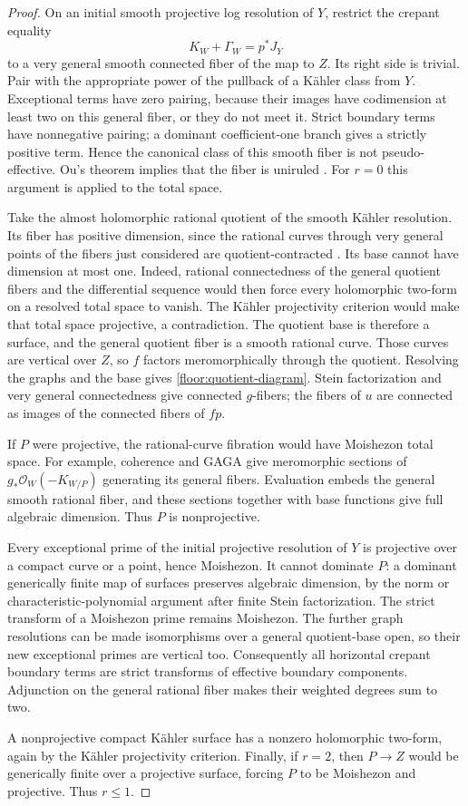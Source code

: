 \documentclass[11pt,letterpaper]{article}
\newcommand{\OO}{\mathcal{O}}
\theoremstyle{definition}
\theoremstyle{remark}
\begin{document}
\begin{proof}
On an initial smooth projective log resolution of $Y$, restrict the
crepant equality
\[
 K_W+\Gamma_W=p^*J_Y
\]
to a very general smooth connected fiber of the map to $Z$.
Its right side is trivial.  Pair with the appropriate power of the
pullback of a K\"ahler class from $Y$.  Exceptional terms have zero
pairing, because their images have codimension at least two on this
general fiber, or they do not meet it.  Strict boundary terms have
nonnegative pairing; a dominant coefficient-one branch gives a
strictly positive term.  Hence the canonical class of this smooth
fiber is not pseudo-effective.  Ou's theorem implies that the
fiber is uniruled \cite{OuUniruledness}.  For $r=0$ this argument is
applied to the total space.

Take the almost holomorphic rational quotient of the smooth
K\"ahler resolution.  Its fiber has positive dimension, since the
rational curves through very general points of the fibers just
considered are quotient-contracted
\cite{CampanaRationalQuotient}.  Its base cannot have dimension
at most one.  Indeed, rational connectedness of the general quotient
fibers and the differential sequence would then force every
holomorphic two-form on a resolved total space to vanish.  The
K\"ahler projectivity criterion would make that total space
projective, a contradiction.  The quotient base is therefore a
surface, and the general quotient fiber is a smooth rational curve.
Those curves are vertical over $Z$, so $f$ factors meromorphically
through the quotient.  Resolving the graphs and the base gives
\eqref{floor:quotient-diagram}.  Stein factorization and very
general connectedness give connected $g$-fibers; the fibers of $u$
are connected as images of the connected fibers of $fp$.

If $P$ were projective, the rational-curve fibration would have
Moishezon total space.  For example, coherence and GAGA give
meromorphic sections of $g_*\OO_W(-K_{W/P})$ generating its general
fibers.  Evaluation embeds the general smooth rational fiber, and
these sections together with base functions give full algebraic
dimension.  Thus $P$ is nonprojective.

Every exceptional prime of the initial projective resolution of
$Y$ is projective over a compact curve or a point, hence Moishezon.
It cannot dominate $P$: a dominant generically finite map of
surfaces preserves algebraic dimension, by the norm or
characteristic-polynomial argument after finite Stein
factorization.  The strict transform of a Moishezon prime remains
Moishezon.  The further graph resolutions can be made isomorphisms
over a general quotient-base open, so their new exceptional primes
are vertical too.  Consequently all horizontal crepant boundary
terms are strict transforms of effective boundary components.
Adjunction on the general rational fiber makes their weighted
degrees sum to two.

A nonprojective compact K\"ahler surface has a nonzero holomorphic
two-form, again by the K\"ahler projectivity criterion.  Finally,
if $r=2$, then $P\to Z$ would be generically finite over a
projective surface, forcing $P$ to be Moishezon and projective.
Thus $r\le1$.
\end{proof}
\end{document}
